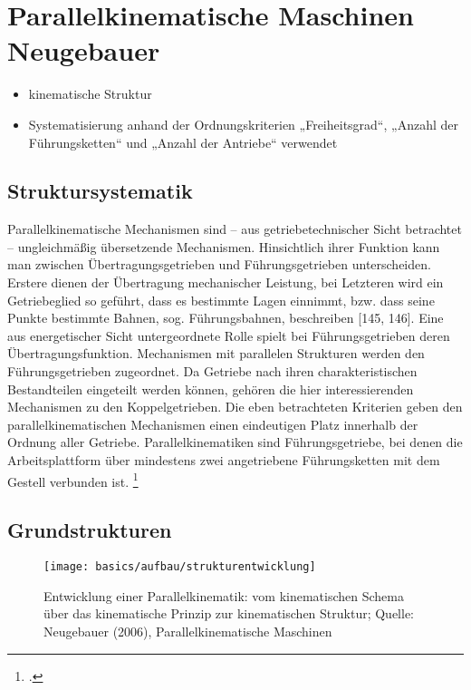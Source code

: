 \section{Parallelkinematische Maschinen Neugebauer}

\begin{itemize}
    \item kinematische Struktur
    \item Systematisierung anhand der Ordnungskriterien „Freiheitsgrad“, „Anzahl der Führungsketten“ und „Anzahl der Antriebe“ verwendet
\end{itemize}

\subsection{Struktursystematik}
Parallelkinematische Mechanismen sind – aus getriebetechnischer Sicht betrachtet – ungleichmäßig übersetzende Mechanismen. Hinsichtlich ihrer Funktion kann man zwischen Übertragungsgetrieben und Führungsgetrieben unterscheiden. Erstere dienen der Übertragung mechanischer Leistung, bei Letzteren wird ein Getriebeglied so geführt, dass es bestimmte Lagen einnimmt, bzw. dass seine Punkte bestimmte Bahnen, sog. Führungsbahnen, beschreiben [145, 146]. Eine aus energetischer Sicht untergeordnete Rolle spielt bei Führungsgetrieben deren Übertragungsfunktion. Mechanismen mit parallelen Strukturen werden den Führungsgetrieben zugeordnet. Da Getriebe nach ihren charakteristischen Bestandteilen eingeteilt werden können, gehören die hier interessierenden Mechanismen zu den Koppelgetrieben. Die eben betrachteten Kriterien geben den parallelkinematischen Mechanismen einen eindeutigen Platz innerhalb der Ordnung aller Getriebe. Parallelkinematiken sind Führungsgetriebe, bei denen die Arbeitsplattform über mindestens zwei angetriebene Führungsketten mit dem Gestell verbunden ist. \footcite[Vgl.][14]{Neugebauer2006}

\subsection{Grundstrukturen}

\begin{figure}[H]
    \centering
    \texttt{[image: basics/aufbau/strukturentwicklung]}
    \caption[Entwicklung einer Parallelkinematik]{Entwicklung einer Parallelkinematik: vom kinematischen Schema über das kinematische Prinzip zur kinematischen Struktur; Quelle: Neugebauer (2006), Parallelkinematische Maschinen}
    \label{fig:stab1}
\end{figure}

